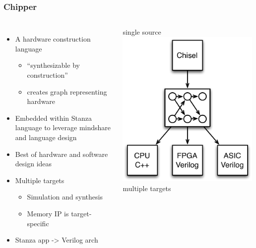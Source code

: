 \documentclass[xcolor=pdflatex,dvipsnames,table]{beamer}
\begin{document}


\begin{frame}[fragile]
\frametitle{Chipper}

\begin{columns}[c]


\begin{itemize}
\item A hardware construction language 
\begin{itemize}
\item ``synthesizable by construction''
\item creates graph representing hardware
\end{itemize}
\item Embedded within Stanza language to leverage mindshare and language design
\item Best of hardware and software design ideas
\item Multiple targets
\begin{itemize}
\item Simulation and synthesis
\item Memory IP is target-specific \\[0.5cm]
\end{itemize}
\item {\color{red}{\bf Not} Stanza app -> Verilog arch}
\end{itemize}


\begin{center}
single source \\
\includegraphics[width=0.99\textwidth]{figs/graph-and-targets.pdf} \\
multiple targets \\
\end{center}


\end{columns}
\end{frame}
\end{document}
